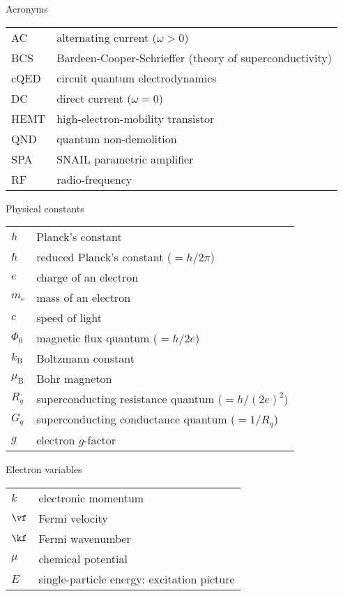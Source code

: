\renewcommand{\arraystretch}{1.4}

{\Large\noindent Acronyms}
\begin{longtable}{ m{5em} m{29em}}
AC & alternating current ($\omega>0$)\\
BCS & Bardeen-Cooper-Schrieffer (theory of superconductivity)\\
cQED & circuit quantum electrodynamics\\
DC & direct current ($\omega=0$)\\
HEMT & high-electron-mobility transistor\\
QND & quantum non-demolition\\
SPA & SNAIL parametric amplifier\\
RF & radio-frequency\\
\end{longtable}
\vspace{.2cm}

{\Large\noindent Physical constants}
\vspace{-.2cm}
\begin{longtable}{ m{5em} m{29em}}
$h$ & Planck's constant \\
$\hbar$ & reduced Planck's constant ($= h / 2\pi$)\\
$e$ & charge of an electron\\
$m_e$ & mass of an electron\\
$c$ & speed of light\\
$\Phi_0$ & magnetic flux quantum ($=h/2e$)\\
$k_\mathrm{B}$ & Boltzmann constant\\
$\mu_\mathrm{B}$ & Bohr magneton\\
$R_q$ & superconducting resistance quantum ($=h/(2e)^2$)\\
$G_q$ & superconducting conductance quantum ($=1/R_q$) \\
$g$ & electron $g$-factor \\
\end{longtable}
\vspace{.2cm}

{\Large\noindent Electron variables}
\vspace{-.2cm}
\begin{longtable}{ m{5em} m{29em}}
$k$ & electronic momentum \\
$\vf$ & Fermi velocity \\
$\kf$ & Fermi wavenumber \\
$\mu$ & chemical potential \\
$E$ & single-particle energy: excitation picture \\
\end{longtable}
\vspace{.2cm}

